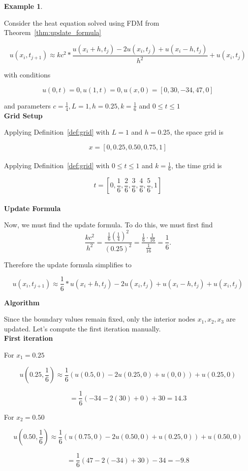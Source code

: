 \documentclass[12pt,letterpaper,reqno]{amsart}
\theoremstyle{definition}
\newtheorem{Example}[thm]{Example}
\numberwithin{thm}{section}
\theoremstyle{remark}
\begin{document}
\begin{Example}
\label{ex}

Consider the heat equation solved using FDM from Theorem~\ref{thm:update_formula}

\[
u(x_i,t_{j+1})  \approx kc^2 * \frac{u(x_i+h,t_j)-2u(x_i,t_j)+u(x_i-h,t_j)}{h^2} + u(x_i,t_{j})
\]

with conditions

\[
u(0,t)=0,  u(1,t)=0, u(x,0)=[0,30,-34,47,0]
\]

and parameters $c=\frac14, L = 1, h = 0.25, k = \frac16$ and $0 \le t \le 1$\\

\textbf{Grid Setup}

Applying Definition~\ref{def:grid} with $L = 1$ and $h = 0.25$, the space grid is

\[
x=[0,0.25,0.50,0.75,1]
\]\\


Applying Definition~\ref{def:grid} with $0 \le t \le 1$ and $k = \frac16$, the time grid is

\[
t= [0, \frac16, \frac26, \frac36, \frac46, \frac56, 1]
\]\\

\textbf{Update Formula}

Now, we must find the update formula. To do this, we must first find 
\[
\frac{k c^2}{h^2}
=
\frac{\frac16 \left(\frac14\right)^2}{(0.25)^2}
=
\frac{\frac16 \cdot \frac1{16}}{\frac1{16}}
=
\frac16 .
\]

Therefore the update formula simplifies to

\[
u(x_i,t_{j+1})  \approx \frac16 * u(x_i+h,t_j)-2u(x_i,t_j)+u(x_i-h,t_j) + u(x_i,t_{j})
\]

\textbf{Algorithm}


Since the boundary values remain fixed, only the interior nodes \(x_1,x_2,x_3\) are updated. Let's compute the first iteration manually.\\

\textbf{First iteration}

For \(x_1=0.25\)

\[
u(0.25, \frac16)
\approx
\frac16(u(0.5,0)-2u(0.25,0)+u(0,0))+u(0.25,0)
\]

\[
=
\frac16(-34-2(30)+0)+30=14.3
\]

For \(x_2=0.50\)

\[
u(0.50,  \frac16)
\approx
\frac16(u(0.75,0)-2u(0.50,0)+u(0.25,0))+u(0.50,0)
\]

\[
=
\frac16(47-2(-34)+30)-34=-9.8
\]


\end{Example}
\end{document}
